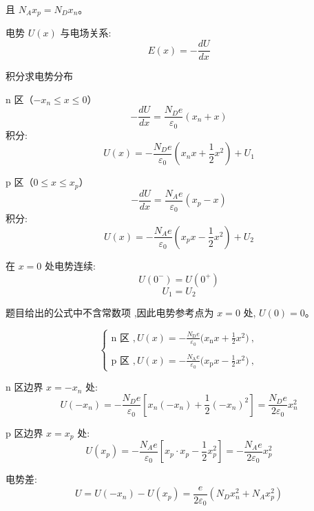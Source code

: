 \documentclass{article}
\begin{document}
且 $N_A x_p = N_D x_n$。

电势 $U(x)$ 与电场关系:
$$E(x) = -\frac{dU}{dx}$$

积分求电势分布

n 区（$-x_n \le x \le 0$）
$$-\frac{dU}{dx} = \frac{N_D e}{\varepsilon_0} (x_n + x)$$
积分:
$$U(x) = -\frac{N_D e}{\varepsilon_0} \left( x_n x + \frac12 x^2 \right) + U_1$$

 p 区（$0 \le x \le x_p$）
$$-\frac{dU}{dx} = \frac{N_A e}{\varepsilon_0} (x_p - x)$$
积分:
$$U(x) = -\frac{N_A e}{\varepsilon_0} \left( x_p x - \frac12 x^2 \right) + U_2$$

在 $x=0$ 处电势连续:
$$U(0^-) = U(0^+)$$
$$U_1 = U_2$$

题目给出的公式中不含常数项 ,因此电势参考点为 $x=0$ 处, $U(0) = 0$。  

$$\begin{cases}\text{n 区 },U(x)=-\frac{N_\text{D}e}{\varepsilon_0}\biggl(x_\text{n}x+\frac12x^2\biggr)\:,\\\\\text{p 区 },U(x)=-\frac{N_\text{A}e}{\varepsilon_0}\biggl(x_\text{p}x-\frac12x^2\biggr)\:,\end{cases}$$

n 区边界 $x = -x_n$ 处:
$$U(-x_n) = -\frac{N_D e}{\varepsilon_0} \left[ x_n(-x_n) + \frac12 (-x_n)^2 \right]
= \frac{N_D e}{2\varepsilon_0} x_n^2$$

p 区边界 $x = x_p$ 处:
$$U(x_p) = -\frac{N_A e}{\varepsilon_0} \left[ x_p \cdot x_p - \frac12 x_p^2 \right]
= -\frac{N_A e}{2\varepsilon_0} x_p^2$$

电势差:
$$U = U(-x_n) - U(x_p)= \frac{e}{2\varepsilon_0} \left( N_D x_n^2 + N_A x_p^2 \right)$$
\end{document}
